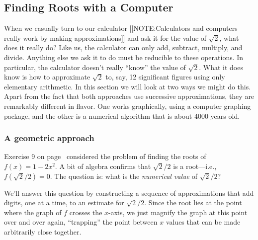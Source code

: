 \subsection{Finding Roots with a Computer}
\label{subsec:finding-roots-with-a-computer}

When we casually turn to our calculator 
[[NOTE:Calculators and computers really work by making approximations]]
and ask it for the value of $\sqrt{2}$, what does it really do?  Like
 us, the calculator can only add, subtract, multiply, and divide.
  Anything else we ask it to do must be reducible to these operations.
  In particular, the calculator doesn't really ``know'' the value of
 $\sqrt{2}$.  What it does know is how to approximate $\sqrt{2}$ to,
 say, 12 significant figures using only elementary arithmetic.  In
 this section we will look at two ways we might do this.  Apart from
 the fact that both approaches use successive approximations, they are
 remarkably different in flavor.  One works graphically, using a
 computer graphing package, and the other is a numerical algorithm
 that is about 4000 years old.

\subsubsection{A geometric approach}
\label{subsubsec:a-geometric-approach}

Exercise 9 on page~\pageref{roots} considered the problem of finding
the roots of $f(x) = 1 - 2x^2$.  A bit of algebra confirms that
$\sqrt{2}/2$ is a root---i.e., $f(\sqrt{2}/2) = 0$.  The question is:
what is the {\em numerical value\/} of $\sqrt{2}/2$?

We'll answer this question by constructing a sequence of
 approximations that add digits, one at a time, to an estimate for
 $\sqrt{2}/2$.  Since the root lies at the point where the graph of
 $f$ crosses the $x$-axis, we just magnify the graph at this point
 over and over again, ``trapping'' the point between $x$ values that
 can be made arbitrarily close together.


